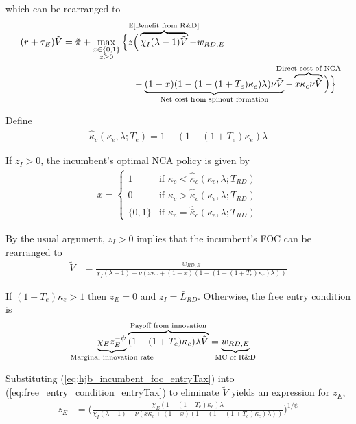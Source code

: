 \documentclass[11pt,english]{article}
\theoremstyle{remark}
\begin{document}
which can be rearranged to
\begin{align}
(r + \tau_E) \tilde{V} = \tilde{\pi} + \max_{\substack{x \in \{0,1\} \\ z \ge 0}} \Big\{z &\Big( \overbrace{\chi_I (\lambda - 1) \tilde{V}}^{\mathclap{\mathbb{E}[\textrm{Benefit from R\&D}]}}- w_{RD,E} \\
&-  \underbrace{(1-x)(1 - (1-(1+T_e)\kappa_{e})\lambda)\nu \tilde{V}}_{\mathclap{\text{Net cost from spinout formation}}} - \overbrace{x \kappa_{c} \nu \tilde{V}}^{\mathclap{\text{Direct cost of NCA}}}\Big) \Big\} \label{eq:hjb_incumbent_entryTax_2}
\end{align}

Define
\begin{align}
\hat{\bar{\kappa}}_c(\kappa_e,\lambda;T_e) = 1 - (1-(1+T_e)\kappa_e)\lambda  \label{eq:barkappa_entryTax}
\end{align} 

If $z_I > 0$, the incumbent's optimal NCA policy is given by 
\begin{align}
x = \begin{cases}
1 & \textrm{if } \kappa_{c} < \hat{\bar{\kappa}}_c (\kappa_e, \lambda;T_{RD}) \\
0 & \textrm{if } \kappa_{c} > \hat{\bar{\kappa}}_c (\kappa_e, \lambda;T_{RD})\\
\{0,1\} & \textrm{if } \kappa_c = \hat{\bar{\kappa}}_c (\kappa_e, \lambda;T_{RD})
\end{cases} \label{eq:nca_policy_entryTax}
\end{align}

By the usual argument, $z_I > 0$ implies that the incumbent's FOC can be rearranged to
\begin{align}
\tilde{V} &= \frac{w_{RD,E}}{\chi_I(\lambda -1) - \nu (x\kappa_c + (1-x)(1 - (1-(1+T_e)\kappa_e)\lambda)) } \label{eq:hjb_incumbent_foc_entryTax}
\end{align}

If $(1 + T_e) \kappa_e > 1$ then $z_E = 0$ and $z_I = \bar{L}_{RD}$. Otherwise, the free entry condition is
\begin{align}
\underbrace{\chi_E z_E^{-\psi}}_{\mathclap{\text{Marginal innovation rate}}} \overbrace{(1-(1+T_e)\kappa_e) \lambda \tilde{V}}^{\mathclap{\text{Payoff from innovation}}} &= \underbrace{w_{RD,E}}_{\mathclap{\text{MC of R\&D}}} \label{eq:free_entry_condition_entryTax}
\end{align}

Substituting (\ref{eq:hjb_incumbent_foc_entryTax}) into (\ref{eq:free_entry_condition_entryTax}) to eliminate $\tilde{V}$ yields an expression for $z_E$, 
\begin{align}
z_E &= \Bigg( \frac{\chi_E (1-(1+T_e)\kappa_{e}) \lambda}{\chi_I(\lambda -1) - \nu (x\kappa_c + (1-x)(1 - (1-(1+T_e)\kappa_e)\lambda)) } \Bigg)^{1/\psi} \label{eq:effort_entrant_entryTax}
\end{align}
\end{document}
